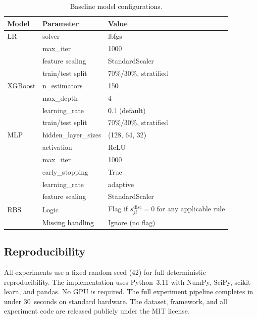 \begin{table}[H]
\centering
\caption{Baseline model configurations.}
\label{tab:baselines}
\renewcommand{\arraystretch}{1.15}
\begin{tabular}{lll}
\toprule
\textbf{Model} & \textbf{Parameter} & \textbf{Value} \\
\midrule
LR      & solver & lbfgs \\
        & max\_iter & 1000 \\
        & feature scaling & StandardScaler \\
        & train/test split & 70\%/30\%, stratified \\[4pt]
XGBoost & n\_estimators & 150 \\
        & max\_depth & 4 \\
        & learning\_rate & 0.1 (default) \\
        & train/test split & 70\%/30\%, stratified \\[4pt]
MLP     & hidden\_layer\_sizes & (128, 64, 32) \\
        & activation & ReLU \\
        & max\_iter & 1000 \\
        & early\_stopping & True \\
        & learning\_rate & adaptive \\
        & feature scaling & StandardScaler \\[4pt]
RBS     & Logic & Flag if $s_{ji}^{\mathrm{disc}} = 0$ for any applicable rule \\
        & Missing handling & Ignore (no flag) \\
\bottomrule
\end{tabular}
\end{table}


\subsection{Reproducibility}

All experiments use a fixed random seed (42) for full deterministic
reproducibility. The implementation uses Python~3.11 with NumPy,
SciPy, scikit-learn, and pandas. No GPU is required. The full
experiment pipeline completes in under 30~seconds on standard
hardware. The dataset, framework, and all experiment code are
released publicly under the MIT license.

